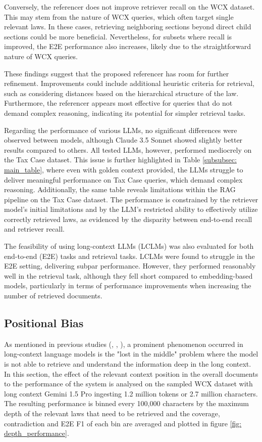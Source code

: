 Conversely, the referencer does not improve retriever recall on the WCX dataset. This may stem from the nature of WCX queries, which often target single relevant laws. In these cases, retrieving neighboring sections beyond direct child sections could be more beneficial. Nevertheless, for subsets where recall is improved, the E2E performance also increases, likely due to the straightforward nature of WCX queries.

These findings suggest that the proposed referencer has room for further refinement. Improvements could include additional heuristic criteria for retrieval, such as considering distances based on the hierarchical structure of the law. Furthermore, the referencer appears most effective for queries that do not demand complex reasoning, indicating its potential for simpler retrieval tasks.

Regarding the performance of various LLMs, no significant differences were observed between models, although Claude 3.5 Sonnet showed slightly better results compared to others. All tested LLMs, however, performed mediocrely on the Tax Case dataset. This issue is further highlighted in Table \ref{subsubsec: main_table}, where even with golden context provided, the LLMs struggle to deliver meaningful performance on Tax Case queries, which demand complex reasoning. Additionally, the same table reveals limitations within the RAG pipeline on the Tax Case dataset. The performance is constrained by the retriever model's initial limitations and by the LLM's restricted ability to effectively utilize correctly retrieved laws, as evidenced by the disparity between end-to-end recall and retriever recall.

The feasibility of using long-context LLMs (LCLMs) was also evaluated for both end-to-end (E2E) tasks and retrieval tasks. LCLMs were found to struggle in the E2E setting, delivering subpar performance. However, they performed reasonably well in the retrieval task, although they fell short compared to embedding-based models, particularly in terms of performance improvements when increasing the number of retrieved documents.

\subsection{Positional Bias}
\label{subsubsec:positional_bias}
As mentioned in previous studies (\cite{laban2024summaryhaystackchallengelongcontext}, \cite{lee2024longcontextlanguagemodelssubsume}, \cite{gavin2024longinschallenginglongcontextinstructionbased}), a prominent phenomenon occurred in long-context language models is the "lost in the middle" problem where the model is not able to retrieve and understand the information deep in the long context. In this section, the effect of the relevant context position in the overall documents to the performance of the system is analysed on the sampled WCX dataset with long context Gemini 1.5 Pro ingesting 1.2 million tokens or 2.7 million characters. The resulting performance is binned every 100,000 characters by the maximum depth of the relevant laws that need to be retrieved and the coverage, contradiction and E2E F1 of each bin are averaged and plotted in figure \ref{fig: depth_performance}.

